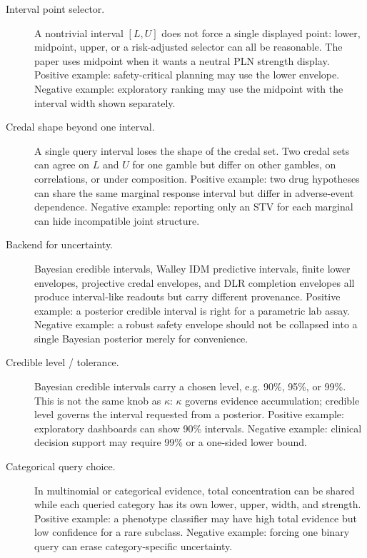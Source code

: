 \documentclass[]{article}
\begin{document}
\begin{description}
\item[Interval point selector.]
      A nontrivial interval $[L,U]$ does not force a single displayed point:
      lower, midpoint, upper, or a risk-adjusted selector can all be
      reasonable. The paper uses midpoint when it wants a neutral PLN
      strength display. Positive example: safety-critical planning may use
      the lower envelope. Negative example: exploratory ranking may use the
      midpoint with the interval width shown separately.

\item[Credal shape beyond one interval.]
      A single query interval loses the shape of the credal set. Two credal
      sets can agree on $L$ and $U$ for one gamble but differ on other
      gambles, on correlations, or under composition. Positive example: two
      drug hypotheses can share the same marginal response interval but differ
      in adverse-event dependence. Negative example: reporting only an STV
      for each marginal can hide incompatible joint structure.

\item[Backend for uncertainty.]
      Bayesian credible intervals, Walley IDM predictive intervals, finite
      lower envelopes, projective credal envelopes, and DLR completion
      envelopes all produce interval-like readouts but carry different
      provenance. Positive example: a posterior credible interval is right
      for a parametric lab assay. Negative example: a robust safety envelope
      should not be collapsed into a single Bayesian posterior merely for
      convenience.

\item[Credible level / tolerance.]
      Bayesian credible intervals carry a chosen level, e.g. 90\%, 95\%, or
      99\%. This is not the same knob as $\kappa$: $\kappa$ governs evidence
      accumulation; credible level governs the interval requested from a
      posterior. Positive example: exploratory dashboards can show 90\%
      intervals. Negative example: clinical decision support may require 99\%
      or a one-sided lower bound.

\item[Categorical query choice.]
      In multinomial or categorical evidence, total concentration can be
      shared while each queried category has its own lower, upper, width, and
      strength. Positive example: a phenotype classifier may have high total
      evidence but low confidence for a rare subclass. Negative example:
      forcing one binary query can erase category-specific uncertainty.


\end{description}
\end{document}
